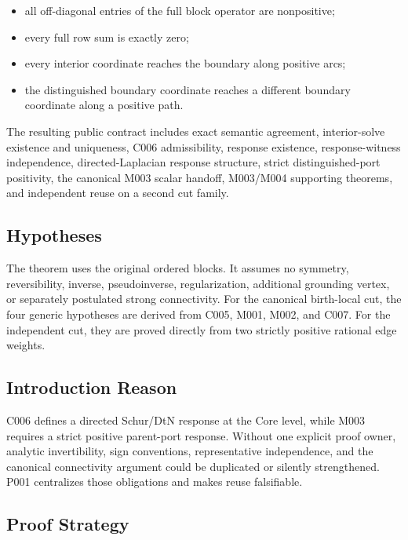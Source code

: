\begin{itemize}
\tightlist
\item
  all off-diagonal entries of the full block operator are nonpositive;
\item
  every full row sum is exactly zero;
\item
  every interior coordinate reaches the boundary along positive arcs;
\item
  the distinguished boundary coordinate reaches a different boundary
  coordinate along a positive path.
\end{itemize}

The resulting public contract includes exact semantic agreement,
interior-solve existence and uniqueness, C006 admissibility, response
existence, response-witness independence, directed-Laplacian response
structure, strict distinguished-port positivity, the canonical M003
scalar handoff, M003/M004 supporting theorems, and independent reuse on
a second cut family.

\subsection{Hypotheses}\label{hypotheses-9}

The theorem uses the original ordered blocks. It assumes no symmetry,
reversibility, inverse, pseudoinverse, regularization, additional
grounding vertex, or separately postulated strong connectivity. For the
canonical birth-local cut, the four generic hypotheses are derived from
C005, M001, M002, and C007. For the independent cut, they are proved
directly from two strictly positive rational edge weights.

\subsection{Introduction Reason}\label{introduction-reason-24}

C006 defines a directed Schur/DtN response at the Core level, while M003
requires a strict positive parent-port response. Without one explicit
proof owner, analytic invertibility, sign conventions, representative
independence, and the canonical connectivity argument could be
duplicated or silently strengthened. P001 centralizes those obligations
and makes reuse falsifiable.

\subsection{Proof Strategy}\label{proof-strategy-9}

